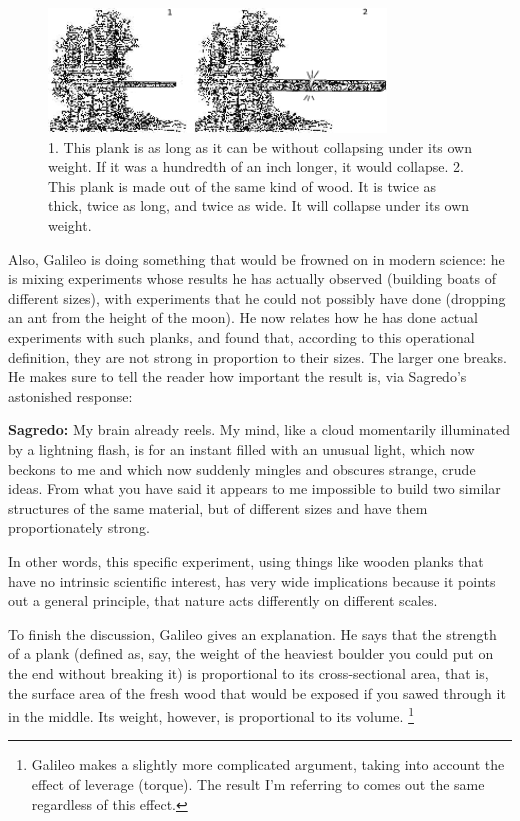 \begin{figure}[ht]
\begin{center}
\includegraphics[width=0.8\textwidth]{./scaling/figs/galileo-plank}
\end{center}
\label{galileo-plank}
\caption{ 1. This plank is as long as it can be
 without collapsing under its own weight. If it was a hundredth of an inch
 longer, it would collapse. 2. This plank is made out of the same kind of
 wood. It is twice as thick, twice as long, and twice as wide. It will
 collapse under its own weight.}
\end{figure}

Also, Galileo is doing something that would be frowned on in
modern science: he is mixing experiments whose results he
has actually observed (building boats of different sizes),
with experiments that he could not possibly have done
(dropping an ant from the height of the moon).
He now relates how he has done actual experiments with such
planks, and found that, according to this operational
definition, they are not strong in proportion to their
sizes. The larger one breaks. He makes sure to tell the
reader how important the result is, via Sagredo's astonished response:

\textbf{Sagredo:} My brain already reels. My mind, like a cloud
momentarily illuminated by a lightning flash, is for an
instant filled with an unusual light, which now beckons to
me and which now suddenly mingles and obscures strange,
crude ideas. From what you have said it appears to me
impossible to build two similar structures of the same
material, but of different sizes and have them proportionately strong.

In other words, this specific experiment, using things like
wooden planks that have no intrinsic scientific interest,
has very wide implications because it points out a general
principle, that nature acts differently on different scales.


To finish the discussion, Galileo gives an explanation. He
says that the strength of a plank (defined as, say, the
weight of the heaviest boulder you could put on the end
without breaking it) is proportional to its cross-sectional
area, that is, the surface area of the fresh wood that would
be exposed if you sawed through it in the middle. Its
weight, however, is proportional to its volume.
\footnote{Galileo
makes a slightly more complicated argument, taking into account
the effect of leverage (torque). The result I'm
referring to comes out the same regardless of this effect.}

